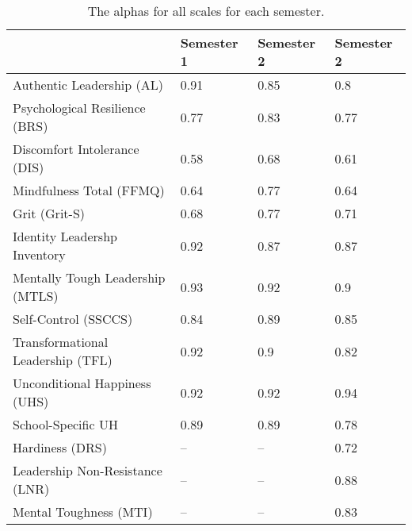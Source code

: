 \begin{table}[ht]
\centering
\begin{tabular}{llll}
  \hline
 & Semester 1 & Semester 2 & Semester 2 \\ 
  \hline
Authentic Leadership (AL) & 0.91 & 0.85 & 0.8 \\ 
  Psychological Resilience (BRS) & 0.77 & 0.83 & 0.77 \\ 
  Discomfort Intolerance (DIS) & 0.58 & 0.68 & 0.61 \\ 
  Mindfulness Total (FFMQ) & 0.64 & 0.77 & 0.64 \\ 
  Grit (Grit-S) & 0.68 & 0.77 & 0.71 \\ 
  Identity Leadershp Inventory & 0.92 & 0.87 & 0.87 \\ 
  Mentally Tough Leadership (MTLS) & 0.93 & 0.92 & 0.9 \\ 
  Self-Control (SSCCS) & 0.84 & 0.89 & 0.85 \\ 
  Transformational Leadership (TFL) & 0.92 & 0.9 & 0.82 \\ 
  Unconditional Happiness (UHS) & 0.92 & 0.92 & 0.94 \\ 
  School-Specific UH & 0.89 & 0.89 & 0.78 \\ 
  Hardiness (DRS) & -- & -- & 0.72 \\ 
  Leadership Non-Resistance (LNR) & -- & -- & 0.88 \\ 
  Mental Toughness (MTI) & -- & -- & 0.83 \\ 
   \hline
\end{tabular}
\caption{The alphas for all scales for each semester.} 
\label{tab:alphas}
\end{table}
